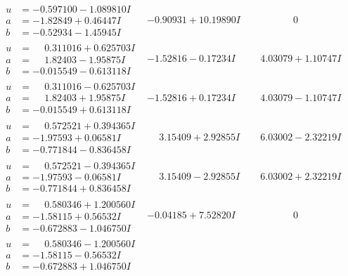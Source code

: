 \documentclass[1p]{elsarticle_modified}
\theoremstyle{definition}
\begin{document}
$$\begin{array}{c|c|c}
\begin{aligned}
u &= -0.597100 - 1.089810 I \\
a &= -1.82849 + 0.46447 I \\
b &= -0.52934 - 1.45945 I\end{aligned}
 & -0.90931 + 10.19890 I & \phantom{-0.000000 } 0 \\ \hline\begin{aligned}
u &= \phantom{-}0.311016 + 0.625703 I \\
a &= \phantom{-}1.82403 - 1.95875 I \\
b &= -0.015549 - 0.613118 I\end{aligned}
 & -1.52816 - 0.17234 I & \phantom{-}4.03079 + 1.10747 I \\ \hline\begin{aligned}
u &= \phantom{-}0.311016 - 0.625703 I \\
a &= \phantom{-}1.82403 + 1.95875 I \\
b &= -0.015549 + 0.613118 I\end{aligned}
 & -1.52816 + 0.17234 I & \phantom{-}4.03079 - 1.10747 I \\ \hline\begin{aligned}
u &= \phantom{-}0.572521 + 0.394365 I \\
a &= -1.97593 + 0.06581 I \\
b &= -0.771844 - 0.836458 I\end{aligned}
 & \phantom{-}3.15409 + 2.92855 I & \phantom{-}6.03002 - 2.32219 I \\ \hline\begin{aligned}
u &= \phantom{-}0.572521 - 0.394365 I \\
a &= -1.97593 - 0.06581 I \\
b &= -0.771844 + 0.836458 I\end{aligned}
 & \phantom{-}3.15409 - 2.92855 I & \phantom{-}6.03002 + 2.32219 I \\ \hline\begin{aligned}
u &= \phantom{-}0.580346 + 1.200560 I \\
a &= -1.58115 + 0.56532 I \\
b &= -0.672883 - 1.046750 I\end{aligned}
 & -0.04185 + 7.52820 I & \phantom{-0.000000 } 0 \\ \hline\begin{aligned}
u &= \phantom{-}0.580346 - 1.200560 I \\
a &= -1.58115 - 0.56532 I \\
b &= -0.672883 + 1.046750 I\end{aligned}

\end{array}$$
\end{document}

